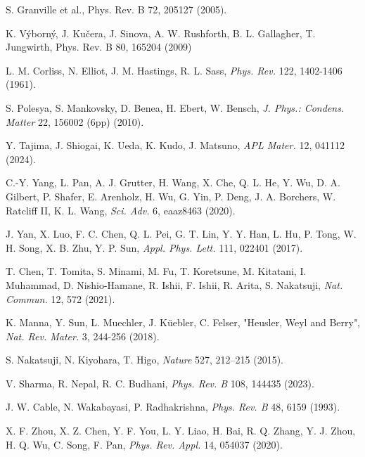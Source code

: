 \documentclass[prb,showpacs,amsmath,amssymb,superscriptaddress,twocolumn,floatfix]{revtex4-1}
\begin{document}
\begin{thebibliography}{99}
S. Granville et al., Phys. Rev. B 72, 205127 (2005).

 K. V\'{y}born\'{y}, J. Ku\v{c}era, J. Sinova, A. W. Rushforth, B. L. Gallagher, T. Jungwirth, Phys. Rev. B 80, 165204 (2009)%

 L. M. Corliss, N. Elliot, J. M. Hastings, R. L. Sass, \textit{Phys. Rev.} 122, 1402-1406 (1961). %

 S. Polesya, S. Mankovsky, D. Benea, H. Ebert, W. Bensch, \textit{J. Phys.: Condens. Matter} 22, 156002 (6pp) (2010). %

 Y. Tajima, J. Shiogai, K. Ueda, K. Kudo, J. Matsuno, \textit{APL Mater.} 12, 041112 (2024). %

 C.-Y. Yang, L. Pan, A. J. Grutter, H. Wang, X. Che, Q. L. He, Y. Wu, D. A. Gilbert, P. Shafer, E. Arenholz, H. Wu, G. Yin, P. Deng, J. A. Borchers, W. Ratcliff II, K. L. Wang, \textit{Sci. Adv.} 6, eaaz8463 (2020). %

 J. Yan, X. Luo, F. C. Chen, Q. L. Pei, G. T. Lin, Y. Y. Han, L. Hu, P. Tong, W. H. Song, X. B. Zhu, Y. P. Sun, \textit{Appl. Phys. Lett.} 111, 022401 (2017). %

 T. Chen, T. Tomita, S. Minami, M. Fu, T. Koretsune, M. Kitatani, I. Muhammad, D. Nishio-Hamane, R. Ishii, F. Ishii, R. Arita, S. Nakatsuji, \textit{Nat. Commun.} 12, 572 (2021). %

 K. Manna, Y. Sun, L. Muechler, J. K\"uebler, C. Felser, "Heusler, Weyl and Berry", \textit{Nat. Rev. Mater.} 3, 244-256 (2018). %

 S. Nakatsuji, N. Kiyohara, T. Higo, \textit{Nature} 527, 212–215 (2015). %

 V. Sharma, R. Nepal, R. C. Budhani, \textit{Phys. Rev. B} 108, 144435 (2023). %

 J. W. Cable, N. Wakabayasi, P. Radhakrishna, \textit{Phys. Rev. B} 48, 6159 (1993). %

 X. F. Zhou, X. Z. Chen, Y. F. You, L. Y. Liao, H. Bai, R. Q. Zhang, Y. J. Zhou, H. Q. Wu, C. Song, F. Pan, \textit{Phys. Rev. Appl.} 14, 054037 (2020). %


\end{thebibliography}
\end{document}
